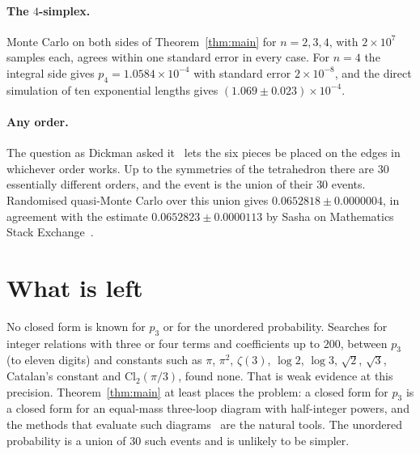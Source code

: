 \documentclass[11pt]{article}
\theoremstyle{remark}
\begin{document}
\paragraph{The $4$-simplex.} Monte Carlo on both sides of Theorem~\ref{thm:main} for $n=2,3,4$, with
$2\times10^7$ samples each, agrees within one standard error in every case. For $n=4$ the integral side
gives $p_4=1.0584\times10^{-4}$ with standard error $2\times10^{-8}$, and the direct simulation of ten
exponential lengths gives $(1.069\pm0.023)\times10^{-4}$.

\paragraph{Any order.} The question as Dickman asked it~\cite{MO} lets the six pieces be placed on the
edges in whichever order works. Up to the symmetries of the tetrahedron there are $30$ essentially
different orders, and the event is the union of their $30$ events. Randomised quasi-Monte Carlo over this
union gives $0.0652818\pm0.0000004$, in agreement with the estimate $0.0652823\pm0.0000113$ by Sasha on
Mathematics Stack Exchange~\cite{MSE}.

\section{What is left}\label{sec:left}

No closed form is known for $p_3$ or for the unordered probability. Searches for integer relations with
three or four terms and coefficients up to $200$, between $p_3$ (to eleven digits) and constants such as
$\pi$, $\pi^2$, $\zeta(3)$, $\log 2$, $\log 3$, $\sqrt2$, $\sqrt3$, Catalan's constant and
$\mathrm{Cl}_2(\pi/3)$, found none. That is
weak evidence at this precision. Theorem~\ref{thm:main} at least places the problem: a closed form for
$p_3$ is a closed form for an equal-mass three-loop diagram with half-integer powers, and the methods that
evaluate such diagrams~\cite{Bro99,BW10} are the natural tools. The unordered probability is a union of $30$
such events and is unlikely to be simpler.
\end{document}
